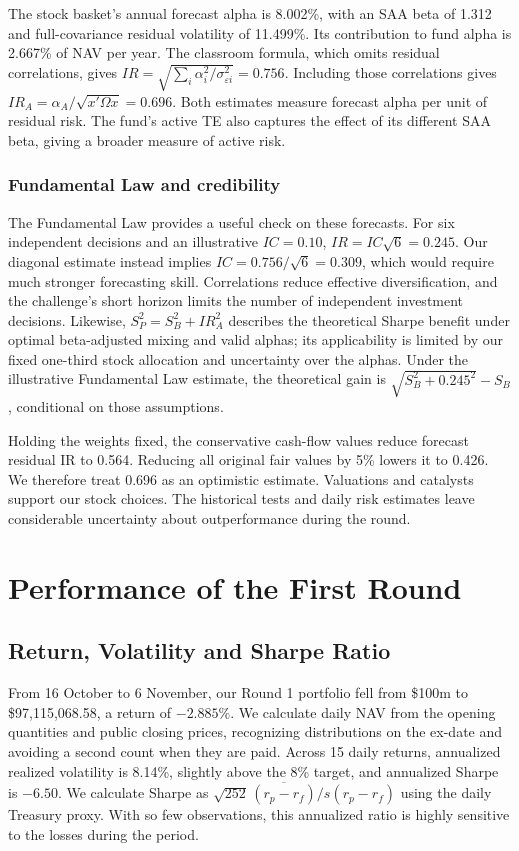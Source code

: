 \documentclass[10pt,a4paper]{article}
\begin{document}
The stock basket's annual forecast alpha is 8.002\%, with an SAA beta of 1.312 and full-covariance residual volatility of 11.499\%. Its contribution to fund alpha is 2.667\% of NAV per year. The classroom formula, which omits residual correlations, gives $IR=\sqrt{\sum_i\alpha_i^2/\sigma_{\varepsilon i}^2}=0.756$. Including those correlations gives $IR_A=\alpha_A/\sqrt{x'\Omega x}=0.696$. Both estimates measure forecast alpha per unit of residual risk. The fund's active TE also captures the effect of its different SAA beta, giving a broader measure of active risk.

\subsubsection*{Fundamental Law and credibility}
The Fundamental Law provides a useful check on these forecasts. For six independent decisions and an illustrative $IC=0.10$, $IR=IC\sqrt{6}=0.245$. Our diagonal estimate instead implies $IC=0.756/\sqrt{6}=0.309$, which would require much stronger forecasting skill. Correlations reduce effective diversification, and the challenge's short horizon limits the number of independent investment decisions. Likewise, $S_P^2=S_B^2+IR_A^2$ describes the theoretical Sharpe benefit under optimal beta-adjusted mixing and valid alphas; its applicability is limited by our fixed one-third stock allocation and uncertainty over the alphas. Under the illustrative Fundamental Law estimate, the theoretical gain is $\sqrt{S_B^2+0.245^2}-S_B$, conditional on those assumptions.

Holding the weights fixed, the conservative cash-flow values reduce forecast residual IR to 0.564. Reducing all original fair values by 5\% lowers it to 0.426. We therefore treat 0.696 as an optimistic estimate. Valuations and catalysts support our stock choices. The historical tests and daily risk estimates leave considerable uncertainty about outperformance during the round.
\clearpage
\section{Performance of the First Round}
\label{sec:performance}
\subsection{Return, Volatility and Sharpe Ratio}
From 16 October to 6 November, our Round 1 portfolio fell from \$100m to \$97,115,068.58, a return of $-2.885\%$. We calculate daily NAV from the opening quantities and public closing prices, recognizing distributions on the ex-date and avoiding a second count when they are paid. Across 15 daily returns, annualized realized volatility is 8.14\%, slightly above the 8\% target, and annualized Sharpe is $-6.50$. We calculate Sharpe as $\sqrt{252}\,\overline{(r_p-r_f)}/s(r_p-r_f)$ using the daily Treasury proxy. With so few observations, this annualized ratio is highly sensitive to the losses during the period.
\end{document}
